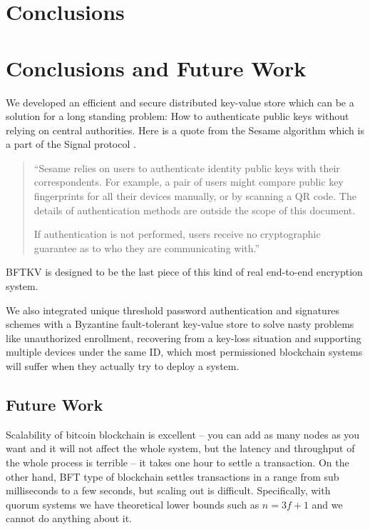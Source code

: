 \ifdefined\ABSTRACT
\section{Conclusions}
\else
\section{Conclusions and Future Work}
\fi
We developed an efficient and secure distributed key-value store which
can be a solution for a long standing problem: How to authenticate
public keys without relying on central authorities. Here is a quote
from the Sesame algorithm which is a part of the Signal protocol
\cite{signal}.
\begin{quote}
``Sesame relies on users to authenticate identity public keys with their
correspondents. For example, a pair of users might compare public key
fingerprints for all their devices manually, or by scanning a QR
code. The details of authentication methods are outside the scope of
this document.

If authentication is not performed, users receive no cryptographic
guarantee as to who they are communicating with.''
\end{quote}
BFTKV is designed to be the last piece of this kind of real end-to-end
encryption system.

We also integrated unique threshold password authentication and
signatures schemes with a Byzantine fault-tolerant key-value store to
solve nasty problems like unauthorized enrollment, recovering from a
key-loss situation and supporting multiple devices under the same ID,
which most permissioned blockchain systems will suffer when they
actually try to deploy a system.

\ifdefined\ABSTRACT
\else
\subsection*{Future Work}
Scalability of bitcoin blockchain is excellent -- you can add as many
nodes as you want and it will not affect the whole system, but the
latency and throughput of the whole process is terrible -- it takes
one hour to settle a transaction.
On the other hand, BFT type of blockchain settles transactions in a
range from sub milliseconds to a few seconds, but scaling out is
difficult. Specifically, with quorum systems we have theoretical lower
bounds such as $n = 3f + 1$ and we cannot do anything about it.

